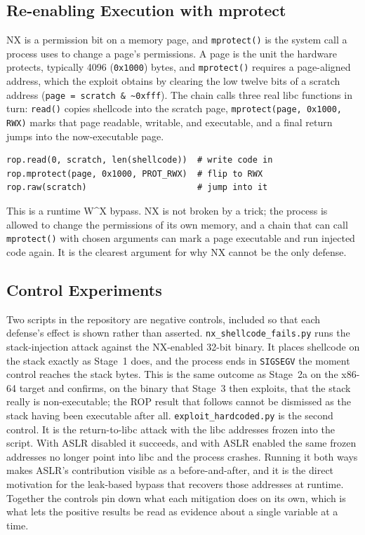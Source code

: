 \documentclass[10pt,twocolumn,letterpaper]{article}
\newcommand{\code}[1]{\texttt{\small #1}}
\begin{document}
\subsection{Re-enabling Execution with mprotect}
NX is a permission bit on a memory page, and \code{mprotect()} is the system call
a process uses to change a page's permissions. A page is the unit the hardware
protects, typically 4096 (\code{0x1000}) bytes, and \code{mprotect()} requires a
page-aligned address, which the exploit obtains by clearing the low twelve bits
of a scratch address (\code{page = scratch \& \textasciitilde 0xfff}). The chain
calls three real libc functions in turn: \code{read()} copies shellcode into the
scratch page, \code{mprotect(page, 0x1000, RWX)} marks that page readable,
writable, and executable, and a final return jumps into the now-executable page.
\begin{lstlisting}[style=py]
rop.read(0, scratch, len(shellcode))  # write code in
rop.mprotect(page, 0x1000, PROT_RWX)  # flip to RWX
rop.raw(scratch)                      # jump into it
\end{lstlisting}
\noindent This is a runtime W\^{}X bypass. NX is not broken by a trick; the
process is allowed to change the permissions of its own memory, and a chain that
can call \code{mprotect()} with chosen arguments can mark a page executable and
run injected code again. It is the clearest argument for why NX cannot be the
only defense.

\subsection{Control Experiments}
Two scripts in the repository are negative controls, included so that each
defense's effect is shown rather than asserted. \code{nx\_shellcode\_fails.py}
runs the stack-injection attack against the NX-enabled 32-bit binary. It places
shellcode on the stack exactly as Stage~1 does, and the process ends in
\code{SIGSEGV} the moment control reaches the stack bytes. This is the same
outcome as Stage~2a on the x86-64 target and confirms, on the binary that
Stage~3 then exploits, that the stack really is non-executable; the ROP result
that follows cannot be dismissed as the stack having been executable after all.
\code{exploit\_hardcoded.py} is the second control. It is the return-to-libc
attack with the libc addresses frozen into the script. With ASLR disabled it
succeeds, and with ASLR enabled the same frozen addresses no longer point into
libc and the process crashes. Running it both ways makes ASLR's contribution
visible as a before-and-after, and it is the direct motivation for the
leak-based bypass that recovers those addresses at runtime. Together the controls
pin down what each mitigation does on its own, which is what lets the positive
results be read as evidence about a single variable at a time.
\end{document}
